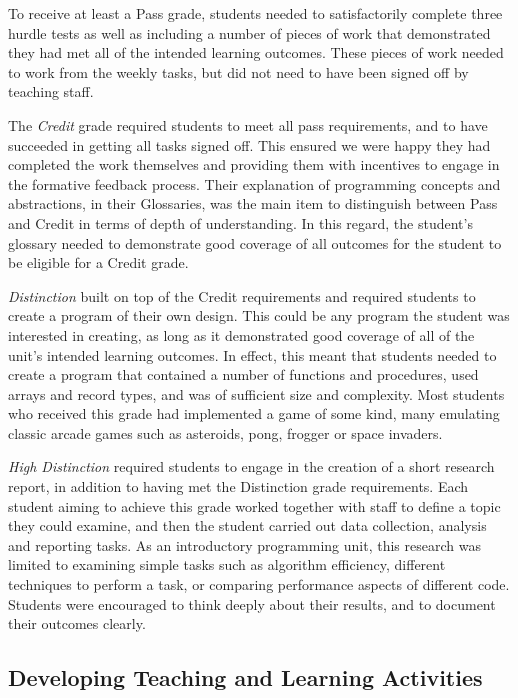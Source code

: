To receive at least a Pass grade, students needed to satisfactorily complete three hurdle tests as well as including a number of pieces of work that demonstrated they had met all of the intended learning outcomes. These pieces of work needed to work from the weekly tasks, but did not need to have been signed off by teaching staff. 

The \emph{Credit} grade required students to meet all pass requirements, and to have succeeded in getting all tasks signed off. This ensured we were happy they had completed the work themselves and providing them with incentives to engage in the formative feedback process. Their explanation of programming concepts and abstractions, in their Glossaries, was the main item to distinguish between Pass and Credit in terms of depth of understanding. In this regard, the student's glossary needed to demonstrate good coverage of all outcomes for the student to be eligible for a Credit grade.

\emph{Distinction} built on top of the Credit requirements and required students to create a program of their own design. This could be any program the student was interested in creating, as long as it demonstrated good coverage of all of the unit's intended learning outcomes. In effect, this meant that students needed to create a program that contained a number of functions and procedures, used arrays and record types, and was of sufficient size and complexity. Most students who received this grade had implemented a game of some kind, many emulating classic arcade games such as asteroids, pong, frogger or space invaders.

\emph{High Distinction} required students to engage in the creation of a short research report, in addition to having met the Distinction grade requirements. Each student aiming to achieve this grade worked together with staff to define a topic they could examine, and then the student carried out data collection, analysis and reporting tasks. As an introductory programming unit, this research was limited to examining simple tasks such as algorithm efficiency, different techniques to perform a task, or comparing performance aspects of different code. Students were encouraged to think deeply about their results, and to document their outcomes clearly.


\subsection{Developing Teaching and Learning Activities} %
\label{sub:intro_developing_teaching_and_learning_activities}

